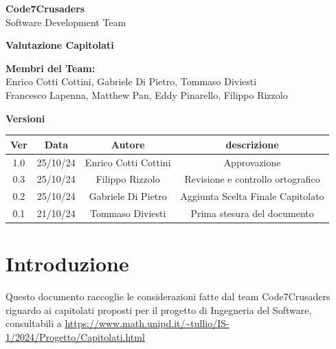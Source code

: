\documentclass{article}
\begin{document}
\begin{titlepage}
    {\Huge \textbf{Code7Crusaders}}\\
    \vspace{0.5cm}
    {\Large Software Development Team}\\
    \vspace{2cm}
    
    {\large \textbf{Valutazione Capitolati}}\\
    \vspace{5cm}

    \textbf{Membri del Team:}\\
    Enrico Cotti Cottini, Gabriele Di Pietro, Tommaso Diviesti \\
    Francesco Lapenna, Matthew Pan, Eddy Pinarello, Filippo Rizzolo \\
    \vspace{0.5cm}
    
    \vspace{1cm}
\end{titlepage}

\newpage
\begin{center}
    \textbf{Versioni}

    \begin{tabular}{|c|c|c|c|}
        \hline
        \textbf{Ver} & \textbf{Data} & \textbf{Autore} & \textbf{descrizione}\\
        \hline
        1.0 & 25/10/24 & Enrico Cotti Cottini & Approvazione \\
        0.3 & 25/10/24 & Filippo Rizzolo & Revisione e controllo ortografico \\
        0.2 & 25/10/24 & Gabriele Di Pietro & Aggiunta Scelta Finale Capitolato \\
        0.1 & 21/10/24 & Tommaso Diviesti & Prima stesura del documento \\
        \hline
    \end{tabular}
\end{center}
\newpage

\tableofcontents
\newpage

\section{Introduzione}

Questo documento raccoglie le considerazioni fatte dal team Code7Crusaders 
riguardo ai capitolati proposti per il progetto di Ingegneria del Software, 
consultabili a 
\newline
\url{https://www.math.unipd.it/~tullio/IS-1/2024/Progetto/Capitolati.html}
\newline
\end{document}
